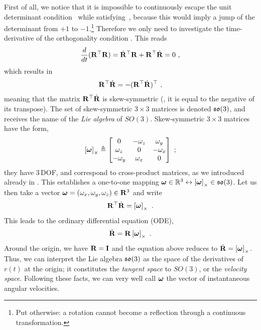 First of all, we notice that it is impossible to continuously escape the unit determinant condition~ while satisfying~, because this would imply a jump of the determinant from $+1$ to $-1$.\footnote{Put otherwise: a rotation cannot become a reflection through a continuous transformation.}
Therefore we only need to investigate the time-derivative of the orthogonality condition . This reads
%
\begin{align}
\frac{d}{dt}{({\bf R}^{\top}{\bf R})} = \dot{{\bf R}}^{\top}{\bf R}+{\bf R}^{\top}\dot{{\bf R}} = 0
~,
\end{align}
%
which results in
%
\begin{align}
{\bf R}^{\top}\dot{{\bf R}} 
= -({\bf R}^{\top}\dot{{\bf R}})^{\top}
~,
\end{align}
%
meaning that the matrix ${\bf R}^{\top}\dot{{\bf R}}$ is skew-symmetric (\ie, it is equal to the negative of its transpose). 
The set of skew-symmetric $3\times3$ matrices is denoted ${\mathfrak {so}}(3)$, and receives the name of the \emph{Lie algebra} of $SO(3)$. 
Skew-symmetric $3\times3$ matrices have the form,
%
\begin{align}
\left[{\bm \omega}\right]_\times \triangleq \begin{bmatrix}
0 & -\omega_z & \omega_y \\
\omega_z & 0 & -\omega_x \\
-\omega_y & \omega_x & 0
\end{bmatrix}
~;
\end{align}
%
they have 3\,DOF, and correspond to cross-product matrices, as we introduced already in . This establishes a one-to-one mapping ${\bm \omega}\in{\mathbb R}^3\leftrightarrow\left[{\bm \omega}\right]_\times\in{\mathfrak {so}}(3)$.
%
Let us then take a vector ${\bm \omega}=(\omega_x,\omega_y,\omega_z)\in{\bf R}^3$ and write
%
\begin{align}
{\bf R}^{\top}\dot{{\bf R}} = \left[{\bm \omega}\right]_\times
~.
\end{align}
%
This leads to the ordinary differential equation (ODE),
%
\begin{align}
\label{equ:Rdot}
\dot{{\bf R}}={\bf R}\left[{\bm \omega}\right]_\times~.
\end{align}
%
Around the origin, we have ${\bf R}={\bf I}$ and the equation above reduces to $\dot{{\bf R}}=\left[{\bm \omega}\right]_\times$. 
Thus, we can interpret the Lie algebra ${\mathfrak {so}}(3)$ as the space of the derivatives of $r(t)$ at the origin;
it constitutes the \emph{tangent space} to $SO(3)$, or the \emph{velocity space}. 
Following these facts, we can very well call ${\bm \omega}$ the vector of instantaneous angular velocities. 

